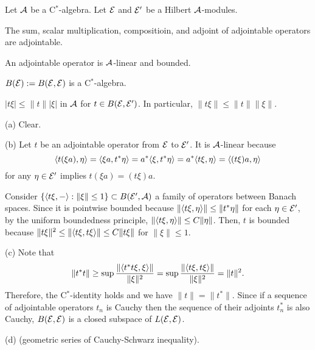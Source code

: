 \documentclass{../../small}
\begin{document}
\begin{prop}
Let $\mathcal{A}$ be a C$^*$-algebra.
Let $\mathcal{E}$ and $\mathcal{E}'$ be a Hilbert $\mathcal{A}$-modules.
\begin{parts}
\item The sum, scalar multiplication, compositioin, and adjoint of adjointable operators are adjointable.
\item An adjointable operator is $\mathcal{A}$-linear and bounded.
\item $B(\mathcal{E}):=B(\mathcal{E},\mathcal{E})$ is a C$^*$-algebra.
\item $|t\xi|\le\|t\||\xi|$ in $\mathcal{A}$ for $t\in B(\mathcal{E},\mathcal{E}')$. In particular, $\|t\xi\|\le\|t\|\|\xi\|$.
\end{parts}
\end{prop}
\begin{pf}
(a)
Clear.

(b)
Let $t$ be an adjointable operator from $\mathcal{E}$ to $\mathcal{E}'$.
It is $\mathcal{A}$-linear because
\[\langle t(\xi a),\eta\rangle=\langle\xi a,t^*\eta\rangle=a^*\langle\xi,t^*\eta\rangle=a^*\langle t\xi,\eta\rangle=\langle(t\xi)a,\eta\rangle\]
for any $\eta\in\mathcal{E}'$ implies $t(\xi a)=(t\xi)a$.

Consider $\{\langle t\xi,-\rangle:\|\xi\|\le1\}\subset B(\mathcal{E}',\mathcal{A})$ a family of operators between Banach spaces.
Since it is pointwise bounded because $\|\langle t\xi,\eta\rangle\|\le\|t^*\eta\|$ for each $\eta\in\mathcal{E}'$, by the uniform boundedness principle, $\|\langle t\xi,\eta\rangle\|\le C\|\eta\|$.
Then, $t$ is bounded because $\|t\xi\|^2\le\|\langle t\xi,t\xi\rangle\|\le C\|t\xi\|$ for $\|\xi\|\le1$.

(c)
Note that
\[\|t^*t\|\ge\sup\frac{\|\langle t^*t\xi,\xi\rangle\|}{\|\xi\|^2}=\sup\frac{\|\langle t\xi,t\xi\rangle\|}{\|\xi\|^2}=\|t\|^2.\]
Therefore, the C$^*$-identity holds and we have $\|t\|=\|t^*\|$.
Since if a sequence of adjointable operators $t_n$ is Cauchy then the sequence of their adjoints $t_n^*$ is also Cauchy, $B(\mathcal{E},\mathcal{E})$ is a closed subspace of $L(\mathcal{E},\mathcal{E})$.

(d) (geometric series of Cauchy-Schwarz inequality).
\end{pf}
\end{document}
